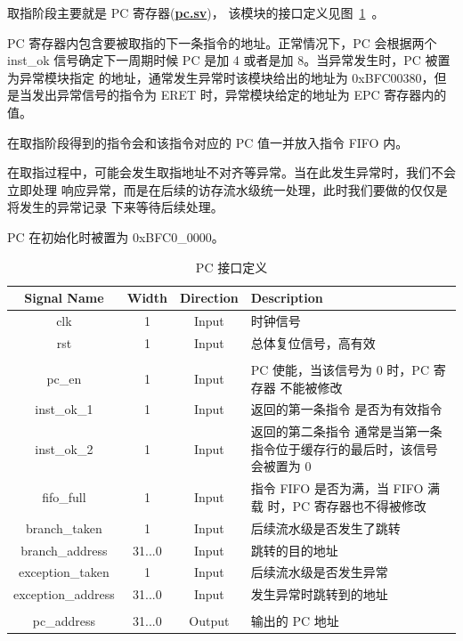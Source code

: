 \documentclass[blue,normal,cn,hide]{elegantbook}
\begin{document}
取指阶段主要就是 PC 寄存器(\href{https://github.com/name1e5s/Sirius/blob/master/pc.sv}{\textbf{pc.sv}})，
该模块的接口定义见图~\ref{tab:PCInterface}~。

PC 寄存器内包含要被取指的下一条指令的地址。正常情况下，PC 会根据两个 inst\_ok
信号确定下一周期时候 PC 是加 4 或者是加 8。当异常发生时，PC 被置为异常模块指定
的地址，通常发生异常时该模块给出的地址为 0xBFC00380，但是当发出异常信号的指令为
ERET 时，异常模块给定的地址为 EPC 寄存器内的值。

在取指阶段得到的指令会和该指令对应的 PC 值一并放入指令 FIFO 内。

在取指过程中，可能会发生取指地址不对齐等异常。当在此发生异常时，我们不会立即处理
响应异常，而是在后续的访存流水级统一处理，此时我们要做的仅仅是将发生的异常记录
下来等待后续处理。

PC 在初始化时被置为 0xBFC0\_0000。

\begin{table}
    \renewcommand\arraystretch{1.25}
    \centering
    \begin{tabular}{cccm{}}
        \toprule 
        \rowcolor{black!20} \textbf{Signal Name} & \textbf{Width} & \textbf{Direction} & \textbf{Description} \\
        \midrule
        clk & 1 & Input & 时钟信号 \\
        rst & 1 & Input & 总体复位信号，高有效 \\
        \\
        pc\_en & 1 & Input & PC 使能，当该信号为 0 时，PC 寄存器
        不能被修改 \\
        inst\_ok\_1 & 1 & Input & 返回的第一条指令
        是否为有效指令 \\
        inst\_ok\_2 & 1 & Input & 返回的第二条指令
        通常是当第一条指令位于缓存行的最后时，该信号会被置为 0 \\
        fifo\_full & 1 & Input & 指令 FIFO 是否为满，当 FIFO 满载
        时，PC 寄存器也不得被修改 \\
        branch\_taken & 1 & Input & 后续流水级是否发生了跳转 \\
        branch\_address & 31...0 & Input & 跳转的目的地址 \\ 
        exception\_taken & 1 & Input & 后续流水级是否发生异常 \\
        exception\_address & 31...0 & Input & 发生异常时跳转到的地址 \\
        \\
        pc\_address & 31...0 & Output & 输出的 PC 地址 \\
        \bottomrule
    \end{tabular}
    \caption{PC 接口定义}
    \label{tab:PCInterface}
\end{table}
\end{document}
